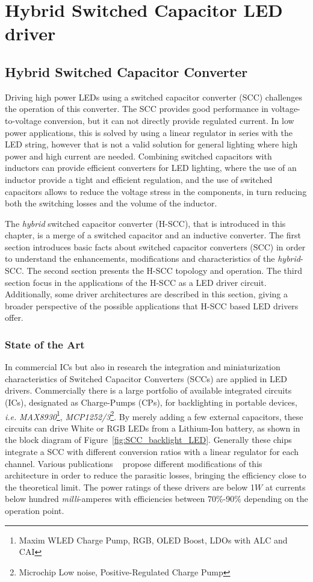 \part{Hybrid Switched Capacitor LED driver}
\chapter{Hybrid Switched Capacitor Converter}
\label{ch:H-SCC}
Driving high power LEDs using a switched capacitor converter (SCC) challenges the operation of this converter. The SCC provides good performance in voltage-to-voltage conversion, but it can not directly provide regulated current. In low power applications, this is solved by using a linear regulator in series with the LED string, however that is not a valid solution for general lighting where high power and high current are needed. Combining switched capacitors with inductors can provide efficient converters for LED lighting, where the use of an inductor provide a tight and efficient regulation, and the use of switched capacitors allows to reduce the voltage stress in the components, in turn reducing both the switching losses and the volume of the inductor.

The \emph{hybrid} switched capacitor converter (H-SCC), that is introduced in this chapter, is a merge of a switched capacitor and an inductive converter. The first section introduces basic facts about switched capacitor converters (SCC) in order to understand the enhancements, modifications and characteristics of the \emph{hybrid}-SCC. The second section presents the H-SCC topology and  operation. The third section focus in the applications of the H-SCC as a LED driver circuit. Additionally, some driver architectures are described in this section, giving a broader perspective of the possible applications that H-SCC based LED drivers offer.

\section{State of the Art}
In  commercial ICs but also in research the integration and miniaturization characteristics of Switched Capacitor Converters (SCCs) are applied in LED drivers. Commercially there is a large portfolio of available integrated circuits (ICs), designated as Charge-Pumps (CPs), for backlighting in portable devices, \emph{i.e.}  \emph{MAX8930}\footnote{Maxim\textsuperscript{\textregistered} WLED Charge Pump, RGB, OLED Boost, LDOs with ALC and CAI }, \emph{MCP1252/3}\footnote{Microchip\textsuperscript{\textregistered} Low noise, Positive-Regulated Charge Pump}. By merely adding a few external capacitors, these circuits can drive White or RGB LEDs from a Lithium-Ion battery, as shown in the block diagram of Figure~\ref{fig:SCC_backlight_LED}. Generally these chips integrate a SCC with different conversion ratios with a linear regulator for each channel. Various publications ~\cite{07Feng,09Wu,10Yin} propose different modifications of this architecture in order to reduce the parasitic losses, bringing the efficiency close to the theoretical limit. The power ratings of these drivers are below 1$W$ at currents below hundred \emph{milli}-amperes with efficiencies between 70\%-90\% depending on the operation point.

